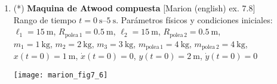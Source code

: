 \documentclass[11pt, spanish, a4paper, twoside]{article}
\begin{document}
\begin{enumerate}
\item
\begin{minipage}[t][6cm]{0.65\textwidth}
(*) \textbf{Maquina de Atwood compuesta} [Marion (english) ex. 7.8]\\ 
Rango de tiempo \(t = \SIrange{0}{5}{\second}\).
Parámetros físicos y condiciones iniciales:\\
\(\ell_1 = \SI{15}{\metre}\), 
\(R_{\mathrm{polea}\,1} = \SI{0.5}{\metre}\), 
\(\ell_2 = \SI{15}{\metre}\), 
\(R_{\mathrm{polea}\,2} = \SI{0.5}{\metre}\),\\ 
\(m_1 = \SI{1}{\kilo\gram}\),
\(m_2 = \SI{2}{\kilo\gram}\),
\(m_3 = \SI{3}{\kilo\gram}\),
\(m_{\mathrm{polea}\,1} = \SI{4}{\kilo\gram}\),
\(m_{\mathrm{polea}\,2} = \SI{4}{\kilo\gram}\),\\
\(x(t=0) = \SI{1}{\metre}\), \(\dot{x}(t=0) = 0\),
\(y(t=0) = \SI{2}{\metre}\), \(\dot{y}(t=0) = 0\)
\end{minipage}
\begin{minipage}[c][0cm][t]{0.3\textwidth}
	\texttt{[image: marion\_fig7\_6]}
\end{minipage}




\end{enumerate}
\end{document}
